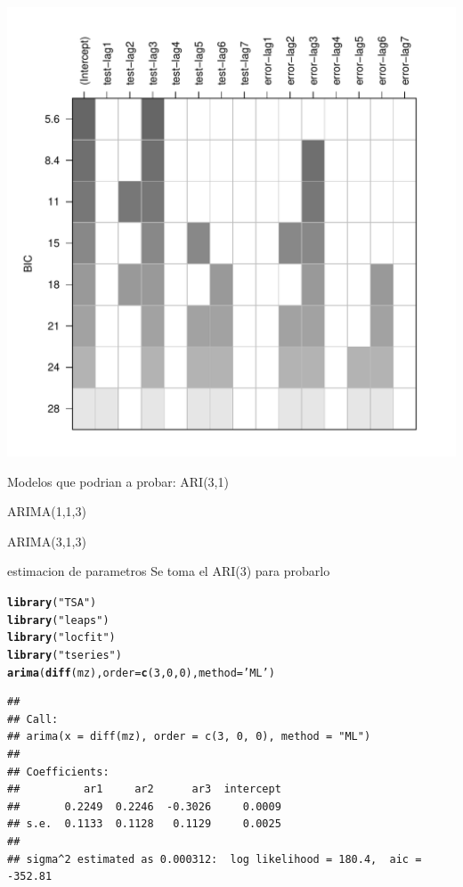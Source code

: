 \documentclass{article}\usepackage[]{graphicx}\usepackage[]{color}
\makeatletter
\def\maxwidth{ %
  \ifdim\Gin@nat@width>\linewidth
    \linewidth
  \else
    \Gin@nat@width
  \fi
}
\newcommand{\hlnum}[1]{\textcolor[rgb]{0.686,0.059,0.569}{#1}}%
\newcommand{\hlstr}[1]{\textcolor[rgb]{0.192,0.494,0.8}{#1}}%
\newcommand{\hlstd}[1]{\textcolor[rgb]{0.345,0.345,0.345}{#1}}%
\newcommand{\hlkwc}[1]{\textcolor[rgb]{0.333,0.667,0.333}{#1}}%
\newcommand{\hlkwd}[1]{\textcolor[rgb]{0.737,0.353,0.396}{\textbf{#1}}}%
\newenvironment{kframe}{%
 \def\at@end@of@kframe{}%
 \ifinner\ifhmode%
  \def\at@end@of@kframe{\end{minipage}}%
  \begin{minipage}{\columnwidth}%
 \fi\fi%
 \def\FrameCommand##1{\hskip\@totalleftmargin \hskip-\fboxsep
 \colorbox{shadecolor}{##1}\hskip-\fboxsep
     \hskip-\linewidth \hskip-\@totalleftmargin \hskip\columnwidth}%
 \MakeFramed {\advance\hsize-\width
   \@totalleftmargin\z@ \linewidth\hsize
   \@setminipage}}%
 {\par\unskip\endMakeFramed%
 \at@end@of@kframe}
\newenvironment{knitrout}{}{} %
\makeatother
\begin{document}
\begin{knitrout}
\includegraphics[width=\maxwidth]{figure/unnamed-chunk-3-3} 

\end{knitrout}

Modelos que podrian a probar:
ARI(3,1)

ARIMA(1,1,3)

ARIMA(3,1,3)

estimacion de parametros
Se toma el ARI(3) para probarlo
\begin{knitrout}
\color{fgcolor}\begin{kframe}
\begin{alltt}
\hlkwd{library}\hlstd{(}\hlstr{"TSA"}\hlstd{)}
\hlkwd{library}\hlstd{(}\hlstr{"leaps"}\hlstd{)}
\hlkwd{library}\hlstd{(}\hlstr{"locfit"}\hlstd{)}
\hlkwd{library}\hlstd{(}\hlstr{"tseries"}\hlstd{)}
\hlkwd{arima}\hlstd{(}\hlkwd{diff}\hlstd{(mz),} \hlkwc{order}\hlstd{=}\hlkwd{c}\hlstd{(}\hlnum{3}\hlstd{,}\hlnum{0}\hlstd{,}\hlnum{0}\hlstd{),}\hlkwc{method}\hlstd{=}\hlstr{'ML'}\hlstd{)}
\end{alltt}
\begin{verbatim}
## 
## Call:
## arima(x = diff(mz), order = c(3, 0, 0), method = "ML")
## 
## Coefficients:
##          ar1     ar2      ar3  intercept
##       0.2249  0.2246  -0.3026     0.0009
## s.e.  0.1133  0.1128   0.1129     0.0025
## 
## sigma^2 estimated as 0.000312:  log likelihood = 180.4,  aic = -352.81
\end{verbatim}
\end{kframe}
\end{knitrout}
\end{document}

